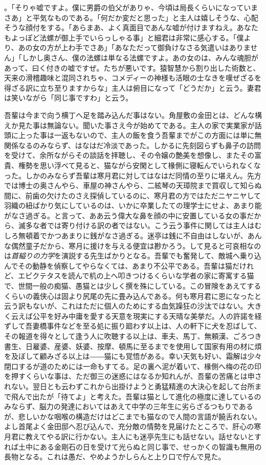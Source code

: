 \documentclass[12pt, openright]{book}
\begin{document}
。「そりゃ嘘ですよ。僕に男爵の伯父がありゃ、今頃は局長くらいになっていまさあ」と平気なものである。「何だか変だと思った」と主人は嬉しそうな、心配そうな顔付をする。「あらまあ、よく真面目であんな嘘が付けますねえ。あなたもよっぽど法螺が御上手でいらっしゃる事」と細君は非常に感心する。「僕より、あの女の方が上わ手でさあ」「あなただって御負けなさる気遣いはありません」「しかし奥さん、僕の法螺は単なる法螺ですよ。あの女のは、みんな魂胆があって、曰く付きの嘘ですぜ。たちが悪いです。猿智慧から割り出した術数と、天来の滑稽趣味と混同されちゃ、コメディーの神様も活眼の士なきを嘆ぜざるを得ざる訳に立ち至りますからな」主人は俯目になって「どうだか」と云う。妻君は笑いながら「同じ事ですわ」と云う。

吾輩は今まで向う横丁へ足を踏み込んだ事はない。角屋敷の金田とは、どんな構えか見た事は無論ない。聞いた事さえ今が始めてである。主人の家で実業家が話頭に上った事は一返もないので、主人の飯を食う吾輩までがこの方面には単に無関係なるのみならず、はなはだ冷淡であった。しかるに先刻図らずも鼻子の訪問を受けて、余所ながらその談話を拝聴し、その令嬢の艶美を想像し、またその富貴、権勢を思い浮べて見ると、猫ながら安閑として椽側に寝転んでいられなくなった。しかのみならず吾輩は寒月君に対してはなはだ同情の至りに堪えん。先方では博士の奥さんやら、車屋の神さんやら、二絃琴の天璋院まで買収して知らぬ間に、前歯の欠けたのさえ探偵しているのに、寒月君の方ではただニヤニヤして羽織の紐ばかり気にしているのは、いかに卒業したての理学士にせよ、あまり能がなさ過ぎる。と言って、ああ云う偉大な鼻を顔の中に安置している女の事だから、滅多な者では寄り付ける訳の者ではない。こう云う事件に関しては主人はむしろ無頓着でかつあまりに銭がなさ過ぎる。迷亭は銭に不自由はしないが、あんな偶然童子だから、寒月に援けを与える便宜は尠かろう。して見ると可哀相なのは\emph{首縊りの力学}を演説する先生ばかりとなる。吾輩でも奮発して、敵城へ乗り込んでその動静を偵察してやらなくては、あまり不公平である。吾輩は猫だけれど、エピクテタスを読んで机の上へ叩きつけるくらいな学者の家に寄寓する猫で、世間一般の痴猫、愚猫とは少しく撰を殊にしている。この冒険をあえてするくらいの義侠心は固より尻尾の先に畳み込んである。何も寒月君に恩になったと云う訳もないが、これはただに個人のためにする血気躁狂の沙汰ではない。大きく云えば公平を好み中庸を愛する天意を現実にする天晴な美挙だ。人の許諾を経ずして吾妻橋事件などを至る処に振り廻わす以上は、人の軒下に犬を忍ばして、その報道を得々として逢う人に吹聴する以上は、車夫、馬丁、無頼漢、ごろつき書生、日雇婆、産婆、妖婆、按摩、頓馬に至るまでを使用して国家有用の材に煩を及ぼして顧みざる以上は――猫にも覚悟がある。幸い天気も好い、霜解は少々閉口するが道のためには一命もすてる。足の裏へ泥が着いて、椽側へ梅の花の印を押すくらいな事は、ただ御三の迷惑にはなるか知れんが、吾輩の苦痛とは申されない。翌日とも云わずこれから出掛けようと勇猛精進の大決心を起して台所まで飛んで出たが「待てよ」と考えた。吾輩は猫として進化の極度に達しているのみならず、脳力の発達においてはあえて中学の三年生に劣らざるつもりであるが、悲しいかな咽喉の構造だけはどこまでも猫なので人間の言語が饒舌れない。よし首尾よく金田邸へ忍び込んで、充分敵の情勢を見届けたところで、肝心の寒月君に教えてやる訳に行かない。主人にも迷亭先生にも話せない。話せないとすれば土中にある金剛石の日を受けて光らぬと同じ事で、せっかくの智識も無用の長物となる。これは愚だ、やめようかしらんと上り口で佇んで見た。
\end{document}
